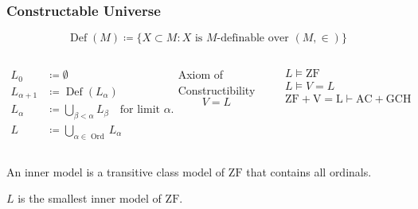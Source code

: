 \documentclass[UTF8,aspectratio=43,11pt,colorlinks,compress,openany]{beamer}%
\begin{document}
\begin{frame}\frametitle{Constructable Universe}
\setlength\abovedisplayskip{0pt}
\setlength\belowdisplayskip{0pt}
\[\operatorname{Def}(M)\coloneqq \big\{X\subset M: X \mbox{ is $M$-definable over } (M,\in)\big\}\]
\begin{columns}
\begin{definition}
\begin{align*}
L_0&\coloneqq \emptyset\\
L_{\alpha+1}&\coloneqq \operatorname{Def}(L_\alpha)\\
L_\alpha&\coloneqq \bigcup\limits_{\beta<\alpha}L_\beta \quad\mbox{for limit } \alpha.\\
L&\coloneqq \bigcup\limits_{\alpha\in\operatorname{Ord}}L_\alpha
\end{align*}
\end{definition}
\begin{block}{Axiom of Constructibility}
\[V=L\]
\end{block}
\begin{align*}
&L\vDash\mathrm{ZF}\\
&L\vDash V=L\\
&\mathrm{ZF+V=L}\vdash\mathrm{AC+GCH}
\end{align*}
\end{columns}
An inner model is a transitive class model of $\mathrm{ZF}$ that contains all ordinals.

$L$ is the smallest inner model of $\mathrm{ZF}$.
\end{frame}
\end{document}
